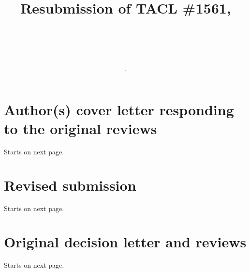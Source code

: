 \documentclass{article}[11pt,a4paper,oneside]
\title{Resubmission of TACL \#1561, \\ \subtitle.   \\}
\newcommand{\resubmission}{char-rnn-knowledge-main1.pdf}  %
\newcommand{\origdecision}{first-round-decision.pdf}  %
\newcommand{\coverfile}{first-round-reply-notes.pdf}  %
\begin{document}
\maketitle

\tableofcontents

\section{Author(s) cover letter responding to the original reviews} Starts on next page.

\section{Revised submission} Starts on next page.

\section{Original decision letter and reviews} Starts on next page.

\end{document}
